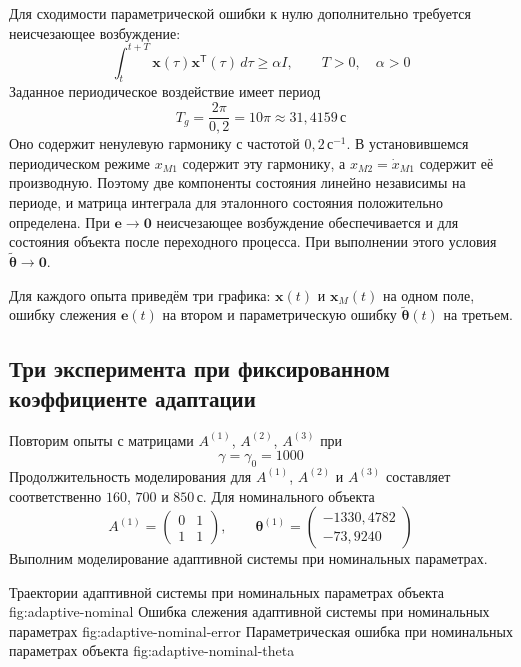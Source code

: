 Для сходимости параметрической ошибки к нулю дополнительно требуется
неисчезающее возбуждение:
\begin{equation}
  \int_t^{t+T}\bm x(\tau)\bm x^{\mathsf T}(\tau)\,d\tau
  \ge\alpha I,
  \qquad T>0,\quad\alpha>0
\end{equation}
Заданное периодическое воздействие имеет период
\begin{equation}
  T_g=\frac{2\pi}{0{,}2}=10\pi\approx31{,}4159\,\text{с}
\end{equation}
Оно содержит ненулевую гармонику с частотой $0{,}2\,\text{с}^{-1}$.
В установившемся периодическом режиме $x_{M1}$ содержит эту гармонику,
а $x_{M2}=\dot x_{M1}$ содержит её производную. Поэтому две компоненты
состояния линейно независимы на периоде, и матрица интеграла для
эталонного состояния положительно определена. При $\bm e\to\bm 0$
неисчезающее возбуждение обеспечивается и для состояния объекта
после переходного процесса. При выполнении этого условия
$\tilde{\bm\theta}\to\bm 0$.

Для каждого опыта приведём три графика: $\bm x(t)$ и $\bm x_M(t)$
на одном поле, ошибку слежения $\bm e(t)$ на втором
и параметрическую ошибку $\tilde{\bm\theta}(t)$ на третьем.

\subsection{Три эксперимента при фиксированном коэффициенте адаптации}

Повторим опыты с матрицами $A^{(1)}$, $A^{(2)}$, $A^{(3)}$ при
\begin{equation}
  \gamma=\gamma_0=1000
\end{equation}
Продолжительность моделирования для $A^{(1)}$, $A^{(2)}$ и $A^{(3)}$
составляет соответственно $160$, $700$ и $850\,\text{с}$.
Для номинального объекта
\begin{equation}
  A^{(1)}=\begin{pmatrix}0&1\\1&1\end{pmatrix},
  \qquad
  \bm\theta^{(1)}=\begin{pmatrix}-1330{,}4782\\-73{,}9240\end{pmatrix}
\end{equation}
Выполним моделирование адаптивной системы при номинальных параметрах.

  {Траектории адаптивной системы при номинальных параметрах объекта}
  {fig:adaptive-nominal}
  {Ошибка слежения адаптивной системы при номинальных параметрах}
  {fig:adaptive-nominal-error}
  {Параметрическая ошибка при номинальных параметрах объекта}
  {fig:adaptive-nominal-theta}


